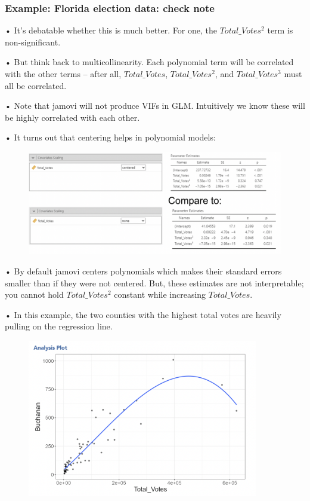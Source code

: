 \documentclass[
  letterpaper,
  DIV=11,
  numbers=noendperiod]{scrreprt}
\begin{document}
\hypertarget{example-florida-election-data-check-note}{%
\subsubsection{Example: Florida election data: check
note}\label{example-florida-election-data-check-note}}

• It's debatable whether this is much better. For one, the
\(Total\_Votes^2\) term is non-significant.

• But think back to multicollinearity. Each polynomial term will be
correlated with the other terms -- after all, \(Total\_Votes\),
\(Total\_Votes^2\), and \(Total\_Votes^3\) must all be correlated.

• Note that jamovi will not produce VIFs in GLM. Intuitively we know
these will be highly correlated with each other.

• It turns out that centering helps in polynomial models:

\begin{figure}

{\centering \includegraphics{images/mod4_pt2_11.png}

}

\end{figure}

• By default jamovi centers polynomials which makes their standard
errors smaller than if they were not centered. But, these estimates are
not interpretable; you cannot hold \(Total\_Votes^2\) constant while
increasing \(Total\_Votes\).

• In this example, the two counties with the highest total votes are
heavily pulling on the regression line.

\begin{figure}

{\centering \includegraphics[width=3.97917in,height=\textheight]{images/mod4_pt2_12.png}

}

\end{figure}
\end{document}
